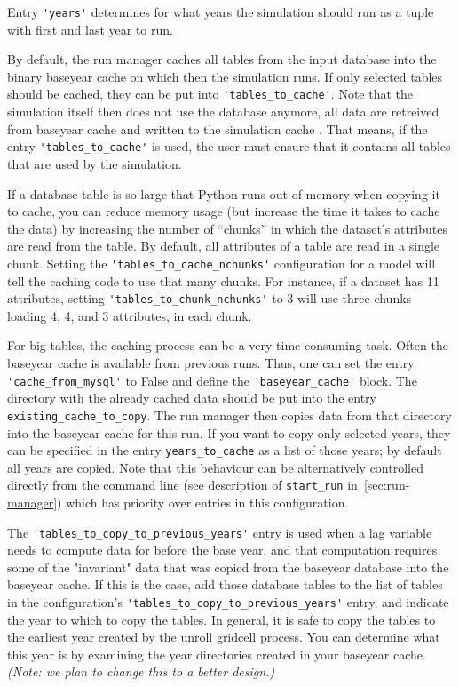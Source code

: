 Entry \verb|'years'| determines for what
years the simulation should run as a tuple with first and last year to run.

By default, the run manager \runmanagerindex caches all tables from the input database into the
binary baseyear cache on which then the simulation runs. If
only selected tables should be cached, they can be put into
\verb|'tables_to_cache'|. Note that the simulation itself then does not use the
database anymore, all data are retreived from baseyear cache
and written to the simulation cache \simulationcacheindex.  That means, if the
entry \verb|'tables_to_cache'| is used, the user must ensure that it contains
all tables that are used by the simulation.

If a database table is so large that Python runs out of memory when copying it
to cache, you can reduce memory usage (but increase the time it takes to cache
the data) by increasing the number of ``chunks'' in which the dataset's 
attributes are read from the table.  By
default, all attributes of a table are read in a single chunk. Setting the
\verb|'tables_to_cache_nchunks'| configuration for a model will tell the caching code
to use that many chunks.  For instance, if a dataset has 11 attributes, setting
\verb|'tables_to_chunk_nchunks'| to 3 will use three chunks loading 4, 4, and 3
attributes, in each chunk.

For big tables, the caching process can be a very time-consuming task. Often
the baseyear cache is available from previous runs. Thus,
one can set the entry \verb|'cache_from_mysql'| \mysqlindex to False and define the
\verb|'baseyear_cache'| block. The directory with the already cached data
should be put into the entry \verb|existing_cache_to_copy|. The run manager \runmanagerindex then
copies data from that directory into the baseyear cache for this run. If you
want to copy only selected years, they can be specified in the entry
\verb|years_to_cache| as a list of those years; by default all years are
copied. Note that this behaviour can be alternatively controlled directly from
the command line (see description of \verb|start_run| in~\ref{sec:run-manager})
which has priority over entries in this configuration.

The \verb|'tables_to_copy_to_previous_years'| entry is used when a
lag variable needs to compute data for before the base year, and that
computation requires some of the "invariant" data that was copied from the
baseyear database into the baseyear cache.  If this is the case, add those
database tables to the list of tables in the configuration's
\verb|'tables_to_copy_to_previous_years'| entry, and indicate the year to which
to copy the tables.  In general, it is safe to copy the tables to the earliest
year created by the unroll gridcell process.  You can determine what this year
is by examining the year directories created in your baseyear cache.
\emph{(Note: we plan to change this to a better design.)}

